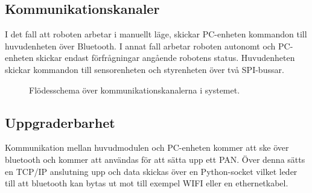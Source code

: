 \subsection{Kommunikationskanaler}
I det fall att roboten arbetar i manuellt läge, skickar PC-enheten kommandon till huvudenheten över Bluetooth. I annat fall arbetar roboten autonomt och PC-enheten skickar endast förfrågningar angående robotens status. Huvudenheten skickar kommandon till sensorenheten och styrenheten över två SPI-bussar.

\begin{figure}[h]
\center
\scalebox{0.6}{}
\caption{Flödesschema över kommunikationskanalerna i systemet.}
\end{figure}

\subsection{Uppgraderbarhet }
Kommunikation mellan huvudmodulen och PC-enheten kommer att ske över bluetooth och kommer att användas för att sätta upp ett PAN. Över denna sätts en TCP/IP anslutning upp och data skickas över en Python-socket vilket leder till att bluetooth kan bytas ut mot till exempel WIFI eller en ethernetkabel.\\
